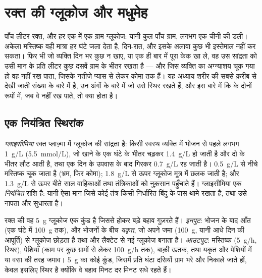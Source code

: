 \chapter{रक्त की ग्लूकोज और मधुमेह}\label{ch:g12:glucose-and-diabetes}

पाँच लीटर रक्त, और हर एक में एक ग्राम ग्लूकोज: यानी कुल पाँच ग्राम, लगभग एक
चीनी की डली। अकेला मस्तिष्क वही मात्रा हर घंटे जला देता है, दिन-रात, और
इसके अलावा कुछ भी इस्तेमाल नहीं कर सकता। फिर भी जो व्यक्ति दिन भर कुछ न
खाए, या एक ही बार में पूरा केक खा ले, वह उस सांद्रता को उसी मान के प्रति
लीटर कुछ दसवें ग्राम के भीतर रखता है --- और जिस व्यक्ति का अग्न्याशय चूक
गया हो वह नहीं रख पाता, जिसके नतीजे प्यास से लेकर कोमा तक हैं। यह अध्याय
शरीर की सबसे क़रीब से देखी जाती संख्या के बारे में है, उन अंगों के बारे में
जो उसे स्थिर रखते हैं, और इस बारे में कि  के दोनों रूपों में, जब वे
नहीं रख पाते, तो क्या होता है।

\section{एक नियंत्रित स्थिरांक}

\begin{definition}[ग्लाइसीमिया]\label{def:g12:glucose-and-diabetes:glycaemia}
\emph{ग्लाइसीमिया} रक्त प्लाज़्मा में ग्लूकोज की
सांद्रता है: किसी स्वस्थ व्यक्ति में भोजन से पहले लगभग \qty{1}{g/L}
(\qty{5.5}{mmol/L}), जो खाने के एक घंटे के भीतर चढ़कर \qty{1.4}{g/L} हो जाती
है और दो के भीतर लौट आती है, तथा एक दिन के उपवास के बाद गिरकर
\qty{0.7}{g/L} रह जाती है। \qty{0.5}{g/L} से नीचे मस्तिष्क चूक जाता है
(भ्रम, फिर कोमा); \qty{1.8}{g/L} से ऊपर ग्लूकोज मूत्र में छलक जाती है; और
\qty{1.3}{g/L} से ऊपर बीते साल वाहिकाओं तथा तंत्रिकाओं को नुक़सान
पहुँचाते हैं। ग्लाइसीमिया एक \emph{नियंत्रित} राशि है: यानी ऐसा मान जिसे
कोई तंत्र किसी निर्धारित बिंदु के पास थामे रखता है, तथा उसे नापता और सुधारता
है।
\end{definition}

\begin{proposition}[ग्लूकोज का कुंड और उसके बहाव]\label{prop:g12:glucose-and-diabetes:pool}
रक्त की वह \qty{5}{g} ग्लूकोज एक कुंड है जिससे होकर बड़े बहाव गुज़रते हैं।
\emph{इनपुट}: भोजन के बाद आँत (एक घंटे में \qty{100}{g} तक), और भोजनों के
बीच \emph{यकृत}, जो अपने जमा \emph{} (\qty{100}{g}, यानी आधे दिन की
आपूर्ति) से ग्लूकोज छोड़ता है तथा  और लैक्टेट से नई ग्लूकोज
बनाता है। \emph{आउटपुट}: मस्तिष्क (\qty{5}{g/h}, स्थिर), पेशियाँ (काम पर
कुछ ग्रामों से लेकर \qty{100}{g/h} तक), बाक़ी ऊतक, तथा यकृत और पेशियों में
 या वसा की तरह जमाव। \qty{5}{g} का कोई कुंड, जिसमें प्रति घंटा
दसियों ग्राम भरे और निकाले जाते हों, केवल इसलिए स्थिर है क्योंकि वे बहाव
मिनट दर मिनट सधे रहते हैं।
\end{proposition}
\admitted

